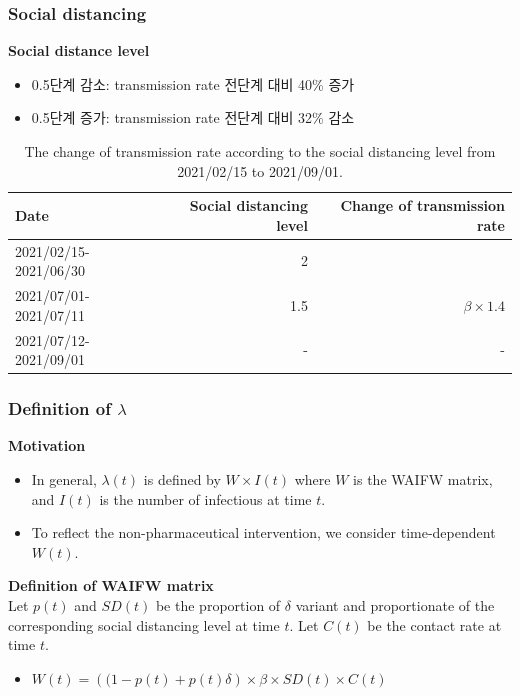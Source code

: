 \documentclass[aspectratio=169, 9pt, xcolor=dvipsnames]{beamer}
\begin{document}
	\begin{frame}\frametitle{Social distancing}
		\textbf{Social distance level}
		\begin{itemize}
			\item 0.5단계 감소: transmission rate 전단계 대비 40\% 증가
			\item 0.5단계 증가: transmission rate 전단계 대비 32\% 감소
		\end{itemize}
	    \begin{table}
	    	\begin{tabular}{lrr}
	    		\toprule
	    		\textbf{Date} & \textbf{Social distancing level} & \textbf{Change of transmission rate} \\
	    		\midrule
	    		2021/02/15-2021/06/30 & 2 &  \\
	    		2021/07/01-2021/07/11 & 1.5 & $\beta \times 1.4$ \\
	    		2021/07/12-2021/09/01\footnotemark[2] & - & - \\
	    		\bottomrule
	    	\end{tabular}
	    	\caption{The change of transmission rate according to the social distancing level from 2021/02/15 to 2021/09/01.}
	    \end{table}
	\end{frame}

	\begin{frame}\frametitle{Definition of $\lambda$}
		\textbf{Motivation}
	    \begin{itemize}
	    	\item In general, $\lambda(t)$ is defined by $W \times I(t)$ where $W$ is the WAIFW matrix, and $I(t)$ is the number of infectious at time $t$.
	    	\item To reflect the non-pharmaceutical intervention, we consider time-dependent $W(t)$.
	    \end{itemize}
	    \vspace{0.5cm}
	    \textbf{Definition of WAIFW matrix} \\
	    Let $p(t)$ and $SD(t)$ be the proportion of $\delta$ variant and proportionate of the corresponding social distancing level at time $t$. Let $C(t)$ be the contact rate at time $t$.
	    \begin{itemize}
	    	\item $W(t) = \left((1 - p(t) + p(t) \delta\right) \times \beta \times SD(t) \times C(t)$
	    \end{itemize}
	\end{frame}
\end{document}
